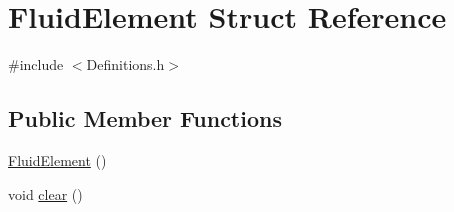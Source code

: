 \hypertarget{struct_fluid_element}{}\section{Fluid\+Element Struct Reference}
\label{struct_fluid_element}


{\ttfamily \#include $<$Definitions.\+h$>$}

\subsection*{Public Member Functions}
\begin{DoxyCompactItemize}
\item 
\hyperlink{struct_fluid_element_aaae89c098314ffcb5cd5a32e500d691c}{Fluid\+Element} ()
\item 
void \hyperlink{struct_fluid_element_ada7d116e06c17828ff57e07653491623}{clear} ()
\end{DoxyCompactItemize}
